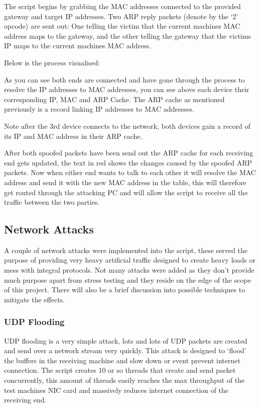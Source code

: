 The script begins by grabbing the MAC addresses connected to the provided gateway and target IP addresses. Two ARP reply packets (denote by the `2' opcode) are sent out: One telling the victim that the current machines MAC address maps to the gateway, and the other telling the gateway that the victims IP maps to the current machines MAC address.

Below is the process visualised:


As you can see both ends are connected and have gone through the process to resolve the IP addresses to MAC addresses, you can see above each device their corresponding IP, MAC and ARP Cache. The ARP cache as mentioned previously is a record linking IP addresses to MAC addresses.


Note after the 3rd device connects to the network, both devices gain a record of its IP and MAC address in their ARP cache. 

After both spoofed packets have been send out the ARP cache for each receiving end gets updated, the text in red shows the changes caused by the spoofed ARP packets. Now when either end wants to talk to each other it will resolve the MAC address and send it with the new MAC address in the table, this will therefore get routed through the attacking PC and will allow the script to receive all the traffic between the two parties.

\subsection{Network Attacks}
A couple of network attacks were implemented into the script, these served the purpose of providing very heavy artificial traffic designed to create heavy loads or mess with integral protocols. Not many attacks were added as they don't provide much purpose apart from stress testing and they reside on the edge of the scope of this project. There will also be a brief discussion into possible techniques to mitigate the effects. 

\subsubsection{UDP Flooding}
UDP flooding is a very simple attack, lots and lots of UDP packets are created and send over a network stream very quickly. This attack is designed to `flood' the buffers in the receiving machine and slow down or event prevent internet connection. The script creates 10 or so threads that create and send packet concurrently, this amount of threads easily reaches the max throughput of the test machines NIC card and massively reduces internet connection of the receiving end.

